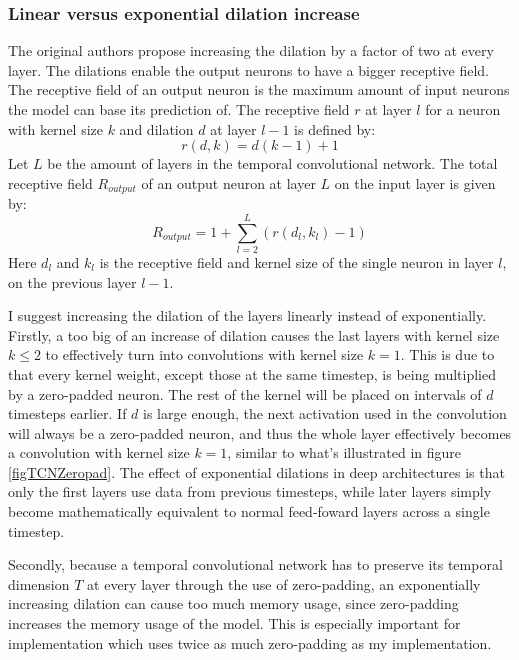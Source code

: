 \documentclass[a4paper, twoside]{article}
\begin{document}
\subsubsection{Linear versus exponential dilation increase}
The original authors propose increasing the dilation by a factor of two at every layer. The dilations enable the output neurons to have a bigger receptive field. The receptive field of an output neuron is the maximum amount of input neurons the model can base its prediction of. The receptive field $r$ at layer $l$ for a neuron with kernel size $k$ and dilation $d$ at layer $l-1$ is defined by: 
\begin{equation}
r(d, k) = d(k-1) +1
\end{equation}
Let $L$ be the amount of layers in the temporal convolutional network. The total receptive field $R_{output}$ of an output neuron at layer $L$ on the input layer is given by:
\begin{equation}
R_{output} = 1+\sum^L_{l=2} (r(d_l, k_l) -1)
\end{equation}
Here $d_l$ and $k_l$ is the receptive field and kernel size of the single neuron in layer $l$, on the previous layer $l-1$.

I suggest increasing the dilation of the layers linearly instead of exponentially. Firstly, a too big of an increase of dilation causes the last layers with kernel size $k \leq 2$ to effectively turn into convolutions with kernel size $k=1$. This is due to that every kernel weight, except those at the same timestep, is being multiplied by a zero-padded neuron. The rest of the kernel will be placed on intervals of $d$ timesteps earlier. If $d$ is large enough, the next activation used in the convolution will always be a zero-padded neuron, and thus the whole layer effectively becomes a convolution with kernel size $k=1$, similar to what's illustrated in figure \ref{figTCNZeropad}. The effect of exponential dilations in deep architectures is that only the first layers use data from previous timesteps, while later layers simply become mathematically equivalent to normal feed-foward layers across a single timestep.

Secondly, because a temporal convolutional network has to preserve its temporal dimension $T$ at every layer through the use of zero-padding, an exponentially increasing dilation can cause too much memory usage, since zero-padding increases the memory usage of the model. This is especially important for \cite{tcn} implementation which uses twice as much zero-padding as my implementation.
\end{document}
